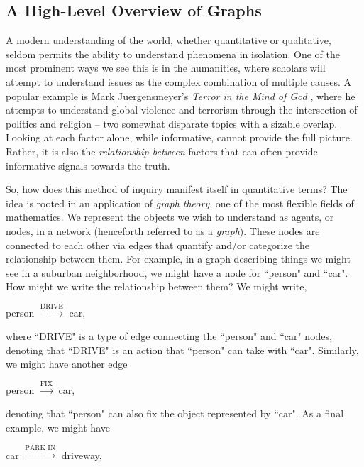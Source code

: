 \documentclass{article}
\theoremstyle{definition}
\begin{document}
\subsection{A High-Level Overview of Graphs}
\label{sec:graphOverview}

A modern understanding of the world, whether quantitative or qualitative, seldom permits the ability to understand phenomena in isolation. One of the most prominent ways we see this is in the humanities, where scholars will attempt to understand issues as the complex combination of multiple causes. A popular example is Mark Juergensmeyer's \textit{Terror in the Mind of God} \cite{terrorInTheMindOfGod}, where he attempts to understand global violence and terrorism through the intersection of politics and religion -- two somewhat disparate topics with a sizable overlap. Looking at each factor alone, while informative, cannot provide the full picture. Rather, it is also the \textit{relationship between} factors that can often provide informative signals towards the truth.

So, how does this method of inquiry manifest itself in quantitative terms? The idea is rooted in an application of \textit{graph theory}, one of the most flexible fields of mathematics. We represent the objects we wish to understand as agents, or nodes, in a network (henceforth referred to as a \textit{graph}). These nodes are connected to each other via edges that quantify and/or categorize the relationship between them. For example, in a graph describing things we might see in a suburban neighborhood, we might have a node for ``person" and ``car". How might we write the relationship between them? We might write,

\begin{center}
    person $\xrightarrow{\text{DRIVE}}$ car,
\end{center}

where ``DRIVE" is a type of edge connecting the ``person" and ``car" nodes, denoting that ``DRIVE" is an action that ``person" can take with ``car". Similarly, we might have another edge

\begin{center}
    person $\xrightarrow{\text{FIX}}$ car,
\end{center}

denoting that ``person" can also fix the object represented by ``car". As a final example, we might have

\begin{center}
    car $\xrightarrow{\text{PARK\_IN}}$ driveway,
\end{center}
\end{document}
